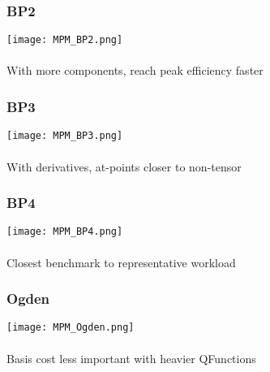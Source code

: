 \documentclass{beamer}
\begin{document}

\begin{frame}
\begin{center}
\frametitle{BP2}

\texttt{[image: MPM\_BP2.png]}\\

~\\

With more components, reach peak efficiency faster

\end{center}
\end{frame}


\begin{frame}
\begin{center}
\frametitle{BP3}

\texttt{[image: MPM\_BP3.png]}\\

~\\

With derivatives, at-points closer to non-tensor

\end{center}
\end{frame}


\begin{frame}
\begin{center}
\frametitle{BP4}

\texttt{[image: MPM\_BP4.png]}\\

~\\

Closest benchmark to representative workload

\end{center}
\end{frame}


\begin{frame}
\begin{center}
\frametitle{Ogden}

\texttt{[image: MPM\_Ogden.png]}\\

~\\

Basis cost less important with heavier QFunctions

\end{center}
\end{frame}
\end{document}

